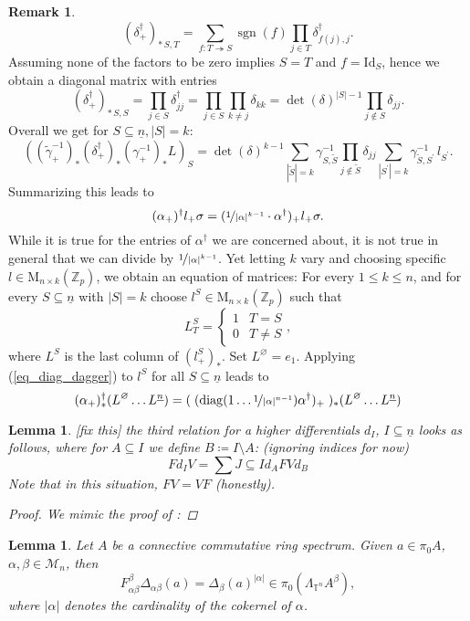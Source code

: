 \documentclass[10pt, a4paper, UKenglish]{article}
\numberwithin{equation}{section}
\newcommand{\cM}{\mathcal{M}}
\newcommand{\bZ}{\mathbb{Z}}
\newcommand{\sT}{\mathbb{T}}		%
\newcommand{\abs}[1]{\left\vert#1\right\vert}	%
\newcommand{\ind}[1]{\underline{#1}}
\newcommand{\onto}{\twoheadrightarrow}
\renewcommand{\subset}{\subseteq}
\newcommand{\sgn}{\operatorname{sgn}}
\newcommand{\M}{\mathrm{M}}
\newcommand{\Id}{\mathrm{Id}}
\newcommand{\diag}{\mathrm{diag}}
\theoremstyle{plain}
\newtheorem{lem}[equation]{Lemma}
\theoremstyle{definition}
\newtheorem{rem}[equation]{Remark}
\newcommand{\twopartdef}[4]
{
	\left\{
		\begin{array}{ll}
			#1 & #2 \\
			#3 & #4
		\end{array}
	\right.
}
\begin{document}
\begin{rem}
$$ (\delta^\dagger_+)_{*\, S,T} = \sum_{f:T \onto S} \sgn(f) \prod_{j \in T} \delta^\dagger_{f(j),j}.$$
Assuming none of the factors to be zero implies $S = T$ and $f = \Id_S$, hence we obtain a diagonal matrix with entries%
$$ (\delta^\dagger_+)_{*\,S,S} = \prod_{j \in S} \delta^\dagger_{jj} = \prod_{j \in S} \prod_{k \neq j} \delta_{kk} = \det(\delta)^{\abs{S}-1} \prod_{j \notin S} \delta_{jj}.$$
Overall we get for $S \subseteq \ind{n}, \abs{S} = k:$
$$ ( (\tilde\gamma_+^{-1})_* (\delta^\dagger_+)_* (\gamma_+^{-1})_* L )_S = %
\det(\delta)^{k-1} \sum_{\abs{\tilde S} = k} \gamma^{-1}_{S,\tilde S} \prod_{j \notin \tilde S} \delta_{jj} \sum_{ \abs{S^\prime} = k } \gamma^{-1}_{\tilde S,S^\prime}\, l_{S^\prime}.$$
Summarizing this leads to
\begin{equation}\label{eq_dagger_comparison}
(\alpha_+)^\dagger l_+ \sigma = (\nicefrac{1}{\abs\alpha^{k-1}}\cdot\alpha^\dagger)_+ l_+ \sigma.\end{equation}
While it is true for the entries of $\alpha^\dagger$ we are concerned about, it is not true in general that we can divide by $\nicefrac{1}{\abs\alpha^{k-1}}$. Yet letting $k$ vary and choosing specific $l \in \M_{n \times k}(\bZ_p)$, we obtain an equation of matrices: For every $1 \leq k \leq n$, and for every $S \subseteq \ind n$ with $\abs S = k$ choose $l^S \in \M_{n \times k}(\bZ_p)$ such that%
$$L^S_T = \twopartdef{1}{T=S}{0}{T \neq S},$$%
where $L^S$ is the last column of $(l^S_+)_*$. Set $L^\varnothing = e_1$. Applying (\ref{eq_diag_dagger}) to $l^S$ for all $S \subseteq \ind n$ leads to
$$	(\alpha_+)^\dagger_*( L^\varnothing \ldots L^{\ind{n}} ) = %
	( \; ( \diag( 1 \ldots \nicefrac{1}{\abs\alpha^{n-1}} ) \alpha^\dagger )_+ \; )_* %
	  ( L^\varnothing \ldots L^{\ind{n}} )$$
\end{rem}
%
%
\begin{lem}\label{lem_rel_FdV_higher_differentials}
[fix this] the third relation for a higher differentials $d_I$, $I \subset \ind{n}$ looks as follows, where for $A \subset I$ we define $B \coloneqq I \setminus A$: (ignoring indices for now)
\begin{equation*}
	F d_I V = \sum{J \subset I} d_A FV d_B
\end{equation*}
Note that in this situation, $FV = VF$ (honestly).
\begin{proof}
We mimic the proof of \cite[Thm. 3.21]{carlsson2011higher}:
\end{proof}
\end{lem}
%
%
\begin{lem}\label{lem_rel_F_Delta}
Let $A$ be a connective commutative ring spectrum. Given $a \in \pi_0 A$, $\alpha, \beta \in \cM_n$, then
	\[ F_{\alpha\beta}^{\beta} \Delta_{\alpha\beta}(a) = \Delta_{\beta} (a)^{\abs{\alpha}} \in \pi_0(\Lambda_{\sT^n} A ^\beta), \]
where $\abs{\alpha}$ denotes the cardinality of the cokernel of $\alpha$.
\end{lem}
\end{document}
